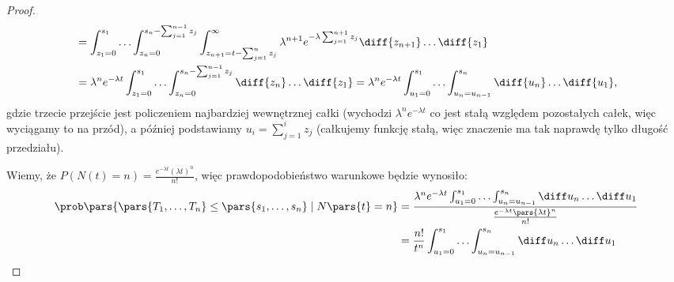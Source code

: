 \begin{proof}
\begin{align*}
		 & = \int_{z_1=0}^{s_1} \ldots \int_{z_n=0}^{s_n - \sum_{j=1}^{n-1} z_j} \int_{z_{n+1}= t - \sum_{j=1}^{n} z_j}^{\infty} \lambda^{n+1}e^{-\lambda \sum_{j=1}^{n+1} z_j} \diff{z_{n+1}} \ldots\diff{z_1}                                           \\
		 & = \lambda^{n} e^{-\lambda t } \int_{z_1=0}^{s_1} \ldots \int_{z_n=0}^{s_n - \sum_{j=1}^{n-1} z_j} \diff{z_n} \ldots \diff{z_1} = \lambda^{n}e^{-\lambda t } \int_{u_1=0}^{s_1} \ldots \int_{u_n = u_{n-1}}^{s_n} \diff{u_n} \ldots\diff{u_1} ,
	\end{align*}
	gdzie trzecie przejście jest policzeniem najbardziej wewnętrznej całki (wychodzi \(\lambda^n e^{-\lambda t}\) co jest stałą względem pozostałych całek, więc wyciągamy to na przód), a później podstawiamy \(u_i = \sum_{j=1}^{i} z_j\) (całkujemy funkcję stałą, więc znaczenie ma tak naprawdę tylko długość przedziału).

	Wiemy, że \(P\left( N\left( t  \right) = n  \right) = \frac{e^{-\lambda t }\left( \lambda t  \right) ^{n}}{n!}\), więc prawdopodobieństwo warunkowe będzie wynosiło:
	\begin{align*}
		\prob\pars{\pars{T_1, \ldots, T_n} \leq \pars{s_1, \ldots, s_n} \mid N\pars{t} = n} & = \frac{\lambda^n e^{-\lambda t} \int_{u_1 = 0}^{s_1} \ldots \int_{u_n = u_{n-1}}^{s_n} \diff u_n \ldots \diff u_1}{\frac{e^{-\lambda t}\pars{\lambda t}^n}{n!}} \\
		                                                                                    & = \frac{n!}{t^n} \int_{u_1 = 0}^{s_1} \ldots \int_{u_n = u_{n-1}}^{s_n} \diff u_n \ldots \diff u_1
	\end{align*}
\end{proof}

